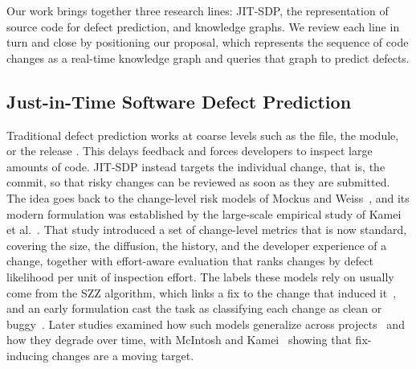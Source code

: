 \documentclass[final,5p,times,twocolumn]{elsarticle}
\theoremstyle{plain}
\begin{document}
Our work brings together three research lines: JIT-SDP, the representation of source code for defect prediction, and knowledge graphs. We review each line in turn and close by positioning our proposal, which represents the sequence of code changes as a real-time knowledge graph and queries that graph to predict defects.

\subsection{Just-in-Time Software Defect Prediction}
\label{subsec:jitsdp}

Traditional defect prediction works at coarse levels such as the file, the module, or the release \cite{Menzies2010}. This delays feedback and forces developers to inspect large amounts of code. JIT-SDP instead targets the individual change, that is, the commit, so that risky changes can be reviewed as soon as they are submitted. The idea goes back to the change-level risk models of Mockus and Weiss~\cite{mockus2000predicting}, and its modern formulation was established by the large-scale empirical study of Kamei et al.~\cite{kamei2013large}. That study introduced a set of change-level metrics that is now standard, covering the size, the diffusion, the history, and the developer experience of a change, together with effort-aware evaluation that ranks changes by defect likelihood per unit of inspection effort. The labels these models rely on usually come from the SZZ algorithm, which links a fix to the change that induced it~\cite{sliwerski2005changes}, and an early formulation cast the task as classifying each change as clean or buggy~\cite{kim2008classifying}. Later studies examined how such models generalize across
projects~\cite{fukushima2014empirical,kamei2016studying} and how they degrade over time, with McIntosh and Kamei~\cite{mcintosh2018fix} showing that fix-inducing changes are a moving target.
\end{document}
